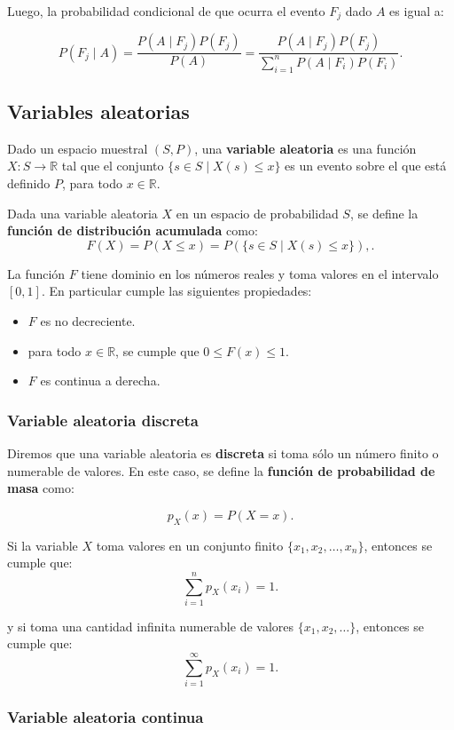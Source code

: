 \documentclass[11pt, a4paper]{article}
\theoremstyle{definition}
\begin{document}
Luego, la probabilidad condicional de que ocurra el evento $F_j$ dado $A$ es igual a:

\[
P(F_j \mid A) = \frac{P(A \mid F_j)P(F_j)}{P(A)} = \frac{P(A \mid F_j)P(F_j)}{\sum_{i=1}^{n} P(A \mid F_i)P(F_i)}. \tag{1.3}
\]

\subsection{Variables aleatorias}

Dado un espacio muestral $(S, P)$, una \textbf{variable aleatoria} es una función $X: S \to \mathbb{R}$ tal que
el conjunto $\{s \in S \mid X(s) \leq x\}$ es un evento sobre el que está definido $P$, para todo $x \in \mathbb{R}$. 


Dada una variable aleatoria $X$ en un espacio de probabilidad $S$, se define la \textbf{función de distribución acumulada} como: 
\[
F(X) = P(X \leq x) = P(\{s \in S \mid X(s) \leq x\}), \tag{1.4}.
\]

La función $F$ tiene dominio en los números reales y toma valores en el intervalo $[0, 1]$. En particular cumple las siguientes propiedades:

\begin{itemize}
    \item $F$ es no decreciente.
    \item para todo $x \in \mathbb{R}$, se cumple que $0 \leq F(x) \leq 1$.
    \item $F$ es continua a derecha. 
\end{itemize}

\subsubsection*{Variable aleatoria discreta}
Diremos que una variable aleatoria es \textbf{discreta} si toma sólo un número finito o numerable de valores.
En este caso, se define la \textbf{función de probabilidad de masa} como:

\[
p_X(x) = P(X = x).
\]

Si la variable $X$ toma valores en un conjunto finito $\{x_1, x_2, \ldots, x_n\}$, entonces se cumple que:
\[
\sum_{i=1}^{n} p_X(x_i) = 1.
\]

y si toma una cantidad infinita numerable de valores $\{x_1, x_2, \ldots\}$, entonces se cumple que:
\[
\sum_{i=1}^{\infty} p_X(x_i) = 1.
\]

\subsubsection*{Variable aleatoria continua}
\end{document}
